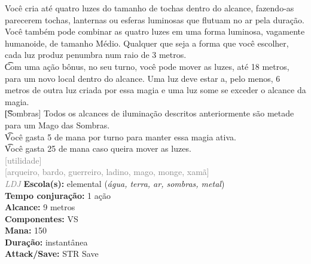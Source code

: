 \documentclass{RPG_Adventure}[2021/10/20]
\begin{document}
{\normalsize Você cria até quatro luzes do tamanho de tochas dentro do alcance, fazendo-as parecerem tochas, lanternas ou esferas luminosas que flutuam no ar pela duração. Você também pode combinar as quatro luzes em uma forma luminosa, vagamente humanoide, de tamanho Médio. Qualquer que seja a forma que você escolher, cada luz produz penumbra num raio de 3 metros.\\\t Com uma ação bônus, no seu turno, você pode mover as luzes, até 18 metros, para um novo local dentro do alcance. Uma luz deve estar a, pelo menos, 6 metros de outra luz criada por essa magia e uma luz some se exceder o alcance da magia.\\\t [Sombras] Todos os alcances de iluminação descritos anteriormente são metade para um Mago das Sombras.\\\t Você gasta 5 de mana por turno para manter essa magia ativa.\\\t Você gasta 25 de mana caso queira mover as luzes.\\}
{\scriptsize \textcolor{gray}{[utilidade]\\}}
{\scriptsize \textcolor{gray}{[arqueiro, bardo, guerreiro, ladino, mago, monge, xamã]\\}}
{\tiny \textcolor{gray}{\textit{LDJ}}}\jump{}
{\small \t \textbf{Escola(s):} elemental (\textit{água, terra, ar, sombras, metal})\\\t \textbf{Tempo conjuração:} 1 ação\\\t \textbf{Alcance:} 9 metros\\\t \textbf{Componentes:} VS\\\t \textbf{Mana:} 150\\\t \textbf{Duração:} instantânea\\\t \textbf{Attack/Save:} STR Save\\}
\end{document}
